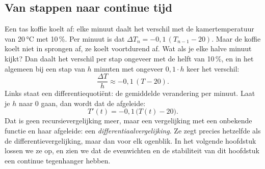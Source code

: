 \subsection{Van stappen naar continue tijd}

Een tas koffie koelt af: elke minuut daalt het verschil met de kamertemperatuur van 20\,°C met 10\,\%. Per minuut is dat $\Delta T_n = -0{,}1\,(T_{n-1} - 20)$. Maar de koffie koelt niet in sprongen af, ze koelt voortdurend af. Wat als je elke halve minuut kijkt? Dan daalt het verschil per stap ongeveer met de helft van 10\,\%, en in het algemeen bij een stap van $h$ minuten met ongeveer $0{,}1 \cdot h$ keer het verschil:
\[
\frac{\Delta T}{h} \approx -0{,}1\,(T - 20) .
\]
Links staat een differentiequotiënt: de gemiddelde verandering per minuut. Laat je $h$ naar 0 gaan, dan wordt dat de afgeleide:
\[
T'(t) = -0{,}1\,\bigl(T(t) - 20\bigr) .
\]
Dat is geen recursievergelijking meer, maar een vergelijking met een onbekende functie en haar afgeleide: een \textit{differentiaalvergelijking}. Ze zegt precies hetzelfde als de differentievergelijking, maar dan voor elk ogenblik. In het volgende hoofdstuk lossen we ze op, en zien we dat de evenwichten en de stabiliteit van dit hoofdstuk een continue tegenhanger hebben.


\opdrachtenkop

